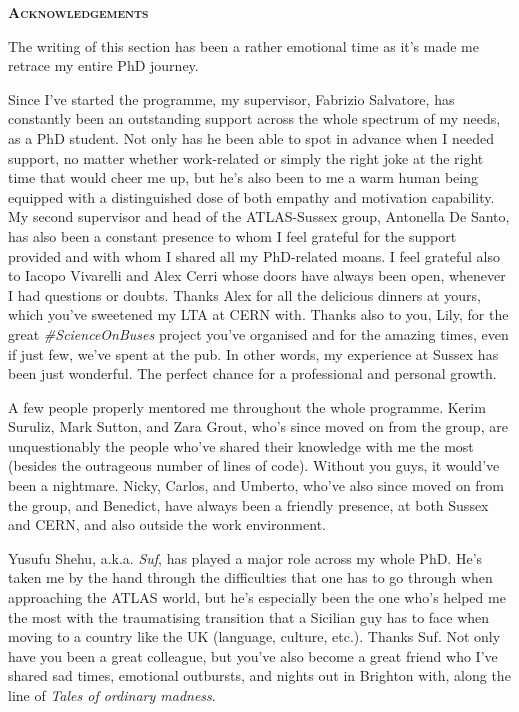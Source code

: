 \pagestyle{empty}%
\begin{center}
	\Huge \textsc{\textbf{Acknowledgements}}
	\hrulefill
\end{center}
The writing of this section has been a rather emotional time as it's made me retrace my entire PhD journey.

Since I've started the programme, my supervisor, Fabrizio Salvatore, has constantly been an outstanding support across the whole spectrum of my needs, as a PhD student. Not only has he been able to spot in advance when I needed support, no matter whether work-related or simply the right joke at the right time that would cheer me up, but he's also been to me a warm human being equipped with a distinguished dose of both empathy and motivation capability. My second supervisor and head of the \textsc{ATLAS}-Sussex group, Antonella De Santo, has also been a constant presence to whom I feel grateful for the support provided and with whom I shared all my PhD-related moans. 
I feel grateful also to Iacopo Vivarelli and Alex Cerri whose doors have always been open, whenever I had questions or doubts. Thanks Alex for all the delicious dinners at yours, which you've sweetened my \textsc{LTA} at \textsc{CERN} with. Thanks also to you, Lily, for the great \emph{\#ScienceOnBuses} project you've organised and for the amazing times, even if just few, we've spent at the pub. In other words, my experience at Sussex has been just wonderful. The perfect chance for a professional and personal growth.

A few people properly mentored me throughout the whole programme. Kerim Suruliz, Mark Sutton, and Zara Grout, who's since moved on from the group, are unquestionably the people who've shared their knowledge with me the most (besides the outrageous number of lines of code). Without you guys, it would've been a nightmare. Nicky, Carlos, and Umberto, who've also since moved on from the group, and Benedict, have always been a friendly presence, at both Sussex and \textsc{CERN}, and also outside the work environment.

Yusufu Shehu, a.k.a. \emph{Suf}, has played a major role across my whole PhD. He's taken me by the hand through the difficulties that one has to go through when approaching the \textsc{ATLAS} world, but he's especially been the one who's helped me the most with the traumatising transition that a Sicilian guy has to face when moving to a country like the UK (language, culture, etc.). Thanks Suf. Not only have you been a great colleague, but you've also become a great friend who I've shared sad times, emotional outbursts, and nights out in Brighton with, along the line of \emph{Tales of ordinary madness}. 

